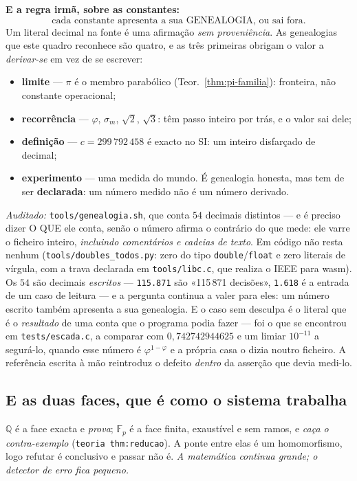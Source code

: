 \documentclass[11pt,a4paper]{article}
\newcommand{\code}[1]{\texttt{\small #1}}
\newcommand{\leitura}[1]{\code{#1}}
\begin{document}
\medskip
\noindent\textbf{E a regra irmã, sobre as constantes:}
\[
\boxed{\;\text{cada constante apresenta a sua GENEALOGIA, ou sai fora.}\;}
\]
Um literal decimal na fonte é uma afirmação \emph{sem proveniência}. As
genealogias que este quadro reconhece são quatro, e as três primeiras
obrigam o valor a \emph{derivar-se} em vez de se escrever:
\begin{itemize}
\item \textbf{limite} --- $\pi$ é o membro parabólico
(Teor.~\ref{thm:pi-familia}): fronteira, não constante operacional;
\item \textbf{recorrência} --- $\varphi$, $\sigma_m$, $\sqrt2$, $\sqrt3$:
têm passo inteiro por trás, e o valor sai dele;
\item \textbf{definição} --- $c=299\,792\,458$ é exacto no SI: um inteiro
disfarçado de decimal;
\item \textbf{experimento} --- uma medida do mundo. É genealogia honesta,
mas tem de ser \textbf{declarada}: um número medido não é um número
derivado.
\end{itemize}
\emph{Auditado:} \code{tools/genealogia.sh}, que conta $54$ decimais distintos
--- e é preciso dizer O QUE ele conta, senão o número afirma o contrário do que
mede: ele varre o ficheiro inteiro, \emph{incluindo comentários e cadeias de
texto}. Em código não resta nenhum (\code{tools/doubles\_todos.py}: zero do tipo
\code{double}/\code{float} e zero literais de vírgula, com a trava declarada em
\code{tools/libc.c}, que realiza o IEEE para wasm). Os $54$ são decimais
\emph{escritos} --- \code{115.871} são «115\,871 decisões», \code{1.618} é a
entrada de um caso de leitura --- e a pergunta continua a valer para eles: um
número escrito também apresenta a sua genealogia. E o caso sem desculpa é o literal que é o
\emph{resultado} de uma conta que o programa podia fazer --- foi o que se
encontrou em \code{tests/escada.c}, a comparar com
$0{,}742742944625$ e um limiar $10^{-11}$ a segurá-lo, quando esse número
é $\varphi^{1-\varphi}$ e a própria casa o dizia noutro ficheiro. A
referência escrita à mão reintroduz o defeito \emph{dentro} da asserção
que devia medi-lo.

\subsection*{E as duas faces, que é como o sistema trabalha}
$\mathbb{Q}$ é a face exacta e \emph{prova}; $\mathbb{F}_p$ é a face
finita, exaustível e sem ramos, e \emph{caça o contra-exemplo}
(\leitura{teoria thm:reducao}). A ponte entre elas é um homomorfismo, logo
refutar é conclusivo e passar não é. \emph{A matemática continua grande;
o detector de erro fica pequeno.}
\end{document}
